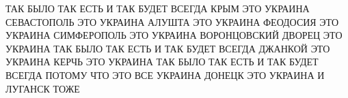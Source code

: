 








ТАК БЫЛО ТАК ЕСТЬ И ТАК БУДЕТ ВСЕГДА КРЫМ ЭТО УКРАИНА СЕВАСТОПОЛЬ ЭТО УКРАИНА
АЛУШТА ЭТО УКРАИНА ФЕОДОСИЯ ЭТО УКРАИНА СИМФЕРОПОЛЬ ЭТО УКРАИНА ВОРОНЦОВСКИЙ
ДВОРЕЦ ЭТО УКРАИНА ТАК БЫЛО ТАК ЕСТЬ И ТАК БУДЕТ ВСЕГДА ДЖАНКОЙ ЭТО УКРАИНА
КЕРЧЬ ЭТО УКРАИНА ТАК БЫЛО ТАК ЕСТЬ И ТАК БУДЕТ ВСЕГДА ПОТОМУ ЧТО ЭТО ВСЕ
УКРАИНА ДОНЕЦК ЭТО УКРАИНА И ЛУГАНСК ТОЖЕ





